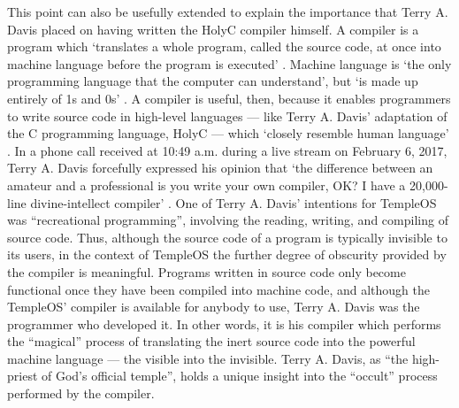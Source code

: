 \documentclass[Draft.tex]{subfiles}
\begin{document}
This point can also be usefully extended to explain
the importance that Terry A. Davis placed
on having written the HolyC compiler himself.
A compiler is a program which `translates a whole program, called the
source code, at once into machine language before the program is executed'
\parencite[323]{Computers}.
Machine language is `the only programming language that the computer can
understand', but `is made up entirely of 1s and 0s'
\parencite[321]{Computers}.
A compiler is useful, then, because it enables programmers to write
source code in high-level languages --- like Terry A. Davis' adaptation of the C
programming language, HolyC --- which `closely resemble human language'
\parencite[323]{Computers}.
In a phone call received at 10:49 a.m. during a live stream
on February 6, 2017, Terry A. Davis  forcefully expressed his opinion that
`the difference between an amateur and a professional is you write your
own compiler, OK? I have a 20,000-line divine-intellect compiler'
\parencite[31:44]{Telephone}.
One of Terry A. Davis' intentions for TempleOS was
``recreational programming'', involving the reading, writing,
and compiling of source code.
Thus, although the source code of a program is typically invisible
to its users, in the context of TempleOS the further degree of obscurity
provided by the compiler is meaningful.
Programs written in source code only become functional
once they have been compiled into machine code, and although the TempleOS'
compiler is available for anybody to use, Terry A. Davis was the programmer
who developed it.
In other words, it is his compiler which performs the ``magical'' process
of translating the inert source code into the powerful
machine language --- the visible into the invisible.
Terry A. Davis, as ``the high-priest of God's official temple'',
holds a unique insight into the ``occult'' process performed by the compiler.
\end{document}
